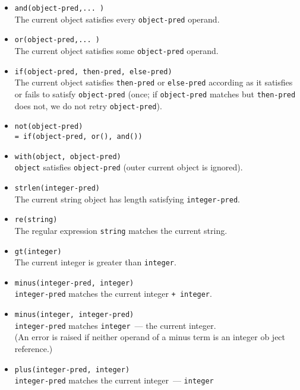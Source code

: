 \begin{itemize}
  \item 
\verb|and(object-pred,... )|\\
The current object satisfies every \verb|object-pred| operand. 
  \item 
\verb|or(object-pred,... )|\\
The current object satisfies some \verb|object-pred| operand. 
  \item 
\verb|if(object-pred, then-pred, else-pred)|\\
The current object satisfies \verb|then-pred| or \verb|else-pred| according as
it satisfies or fails to satisfy \verb|object-pred| (once; if \verb|object-pred|
matches but \verb|then-pred| does not, we do not retry \verb|object-pred|). 
  \item 
\verb|not(object-pred)|\\
\verb|= if(object-pred, or(), and())|
  \item 
\verb|with(object, object-pred)|\\
\verb|object| satisfies \verb|object-pred| (outer current object is ignored).
  \item 
\verb|strlen(integer-pred)|\\
The current string object has length satisfying \verb|integer-pred|. 
  \item 
\verb|re(string)|\\
The regular expression \verb|string| matches the current string. 
  \item 
\verb|gt(integer)|\\
The current integer is greater than \verb|integer|. 
  \item 
\verb|minus(integer-pred, integer)|\\
\verb|integer-pred| matches the current integer \verb|+ integer|. 
  \item 
\verb|minus(integer, integer-pred)|\\
\verb|integer-pred| matches \verb|integer|\ --- the current integer.\\
(An error is raised if neither operand of a minus term
is an integer ob ject reference.) 
  \item 
\verb|plus(integer-pred, integer)|\\
\verb|integer-pred| matches the current integer\ --- \verb|integer|


\end{itemize}
